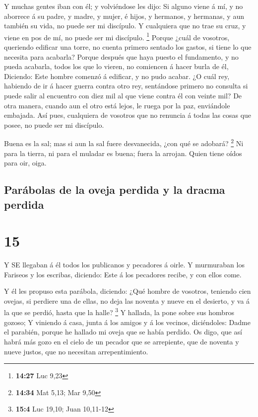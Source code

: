  Y muchas gentes iban con él; y volviéndose les dijo:
 Si alguno viene á mí, y no aborrece á su padre, y madre, y
mujer, é hijos, y hermanos, y hermanas, y aun también su vida, no puede
ser mi discípulo.  Y cualquiera que no trae su cruz, y
viene en pos de mí, no puede ser mi discípulo. \footnote{\textbf{14:27}
  Luc 9,23}  Porque ¿cuál de vosotros, queriendo edificar
una torre, no cuenta primero sentado los gastos, si tiene lo que
necesita para acabarla?  Porque después que haya puesto el
fundamento, y no pueda acabarla, todos los que lo vieren, no comiencen á
hacer burla de él,  Diciendo: Este hombre comenzó á
edificar, y no pudo acabar.  ¿O cuál rey, habiendo de ir á
hacer guerra contra otro rey, sentándose primero no consulta si puede
salir al encuentro con diez mil al que viene contra él con veinte mil?
 De otra manera, cuando aun el otro está lejos, le ruega
por la paz, enviándole embajada.  Así pues, cualquiera de
vosotros que no renuncia á todas las cosas que posee, no puede ser mi
discípulo.

 Buena es la sal; mas si aun la sal fuere desvanecida, ¿con
qué se adobará? \footnote{\textbf{14:34} Mat 5,13; Mar 9,50}
 Ni para la tierra, ni para el muladar es buena; fuera la
arrojan. Quien tiene oídos para oir, oiga.

\hypertarget{paruxe1bolas-de-la-oveja-perdida-y-la-dracma-perdida}{%
\subsection{Parábolas de la oveja perdida y la dracma
perdida}\label{paruxe1bolas-de-la-oveja-perdida-y-la-dracma-perdida}}

\hypertarget{section-14}{%
\section{15}\label{section-14}}

 Y SE llegaban á él todos los publicanos y pecadores á
oirle.  Y murmuraban los Fariseos y los escribas, diciendo:
Este á los pecadores recibe, y con ellos come.

 Y él les propuso esta parábola, diciendo:  ¿Qué
hombre de vosotros, teniendo cien ovejas, si perdiere una de ellas, no
deja las noventa y nueve en el desierto, y va á la que se perdió, hasta
que la halle? \footnote{\textbf{15:4} Luc 19,10; Juan 10,11-12}
 Y hallada, la pone sobre sus hombros gozoso;  Y
viniendo á casa, junta á los amigos y á los vecinos, diciéndoles: Dadme
el parabién, porque he hallado mi oveja que se había perdido.
 Os digo, que así habrá más gozo en el cielo de un pecador
que se arrepiente, que de noventa y nueve justos, que no necesitan
arrepentimiento.

